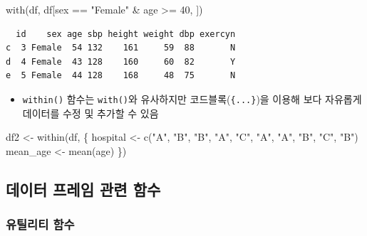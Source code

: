 \documentclass[
  11pt,
]{krantz}
\newenvironment{Shaded}{\begin{snugshade}}{\end{snugshade}}
\newcommand{\DecValTok}[1]{\textcolor[rgb]{0.06,0.06,0.06}{#1}}
\newcommand{\FunctionTok}[1]{\textcolor[rgb]{0,0,0}{#1}}
\newcommand{\NormalTok}[1]{#1}
\newcommand{\OtherTok}[1]{\textcolor[rgb]{0.37,0.37,0.37}{#1}}
\newcommand{\SpecialCharTok}[1]{\textcolor[rgb]{0,0,0}{#1}}
\newcommand{\StringTok}[1]{\textcolor[rgb]{0.5,0.5,0.5}{#1}}
\providecommand{\tightlist}{%
  \setlength{\itemsep}{0pt}\setlength{\parskip}{0pt}}
\begin{document}
\footnotesize

\begin{Shaded}
\begin{Highlighting}[]
\FunctionTok{with}\NormalTok{(df, df[sex }\SpecialCharTok{==} \StringTok{"Female"} \SpecialCharTok{\&}\NormalTok{ age }\SpecialCharTok{\textgreater{}=} \DecValTok{40}\NormalTok{, ])}
\end{Highlighting}
\end{Shaded}

\begin{verbatim}
  id    sex age sbp height weight dbp exercyn
c  3 Female  54 132    161     59  88       N
d  4 Female  43 128    160     60  82       Y
e  5 Female  44 128    168     48  75       N
\end{verbatim}

\normalsize

\begin{itemize}
\tightlist
\item
  \texttt{within()} 함수는 \texttt{with()}와 유사하지만 코드블록(\texttt{\{...\}})을 이용해 보다 자유롭게 데이터를 수정 및 추가할 수 있음
\end{itemize}

\footnotesize

\begin{Shaded}
\begin{Highlighting}[]
\NormalTok{df2 }\OtherTok{\textless{}{-}} \FunctionTok{within}\NormalTok{(df, \{}
\NormalTok{  hospital }\OtherTok{\textless{}{-}} \FunctionTok{c}\NormalTok{(}\StringTok{"A"}\NormalTok{, }\StringTok{"B"}\NormalTok{, }\StringTok{"B"}\NormalTok{, }\StringTok{"A"}\NormalTok{, }\StringTok{"C"}\NormalTok{, }
                \StringTok{"A"}\NormalTok{, }\StringTok{"A"}\NormalTok{, }\StringTok{"B"}\NormalTok{, }\StringTok{"C"}\NormalTok{, }\StringTok{"B"}\NormalTok{)}
\NormalTok{  mean\_age }\OtherTok{\textless{}{-}} \FunctionTok{mean}\NormalTok{(age)}
\NormalTok{\})}
\end{Highlighting}
\end{Shaded}

\normalsize

\hypertarget{data-frame-function}{%
\subsection{데이터 프레임 관련 함수}\label{data-frame-function}}

\hypertarget{data-frame-utility}{%
\subsubsection*{유틸리티 함수}\label{data-frame-utility}}
\end{document}
